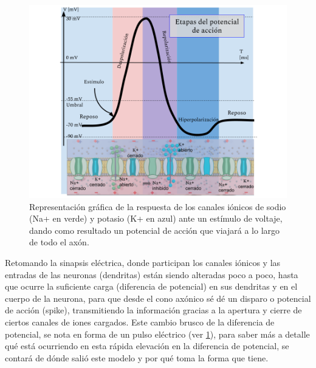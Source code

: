 \begin{figure}[h]
 \centering
 \includegraphics[scale=0.5]{../Figuras/Grafica.png}
 \caption{Representación gráfica de la respuesta de los canales iónicos de sodio (Na+ en verde) y potasio (K+ en azul) ante un estímulo de voltaje, dando como resultado un potencial de acción que viajará a lo largo de todo el axón.}
 \label{fig:graficaP}
\end{figure}

Retomando la sinapsis eléctrica, donde participan los canales iónicos y las entradas de las neuronas (dendritas) están siendo alteradas poco a poco, hasta que ocurre la suficiente carga (diferencia de potencial) en sus dendritas y en el cuerpo de la neurona, para que desde el cono axónico sé dé un disparo o potencial de acción (spike), transmitiendo la información gracias a la apertura y cierre de ciertos canales de iones cargados. Este cambio brusco de la diferencia de potencial, se nota en forma de un pulso eléctrico (ver \ref{fig:graficaP}), para saber más a detalle qué está ocurriendo en esta rápida elevación en la diferencia de potencial, se contará de dónde salió este modelo y por qué toma la forma que tiene. 

